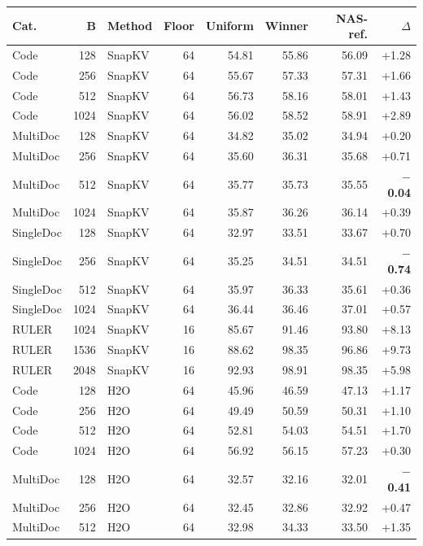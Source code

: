 \begin{table}[!b]
  \centering
  \scriptsize
  \setlength{\tabcolsep}{2.5pt}
  \begin{tabular}{@{}l r l r r r r r@{}}
    \toprule
    Cat. & B & Method & Floor & Uniform & Winner & NAS-ref. & $\Delta$ \\
    \midrule
    Code & 128 & SnapKV & 64 & 54.81 & 55.86 & 56.09 & +1.28 \\
    Code & 256 & SnapKV & 64 & 55.67 & 57.33 & 57.31 & +1.66 \\
    Code & 512 & SnapKV & 64 & 56.73 & 58.16 & 58.01 & +1.43 \\
    Code & 1024 & SnapKV & 64 & 56.02 & 58.52 & 58.91 & +2.89 \\
    MultiDoc & 128 & SnapKV & 64 & 34.82 & 35.02 & 34.94 & +0.20 \\
    MultiDoc & 256 & SnapKV & 64 & 35.60 & 36.31 & 35.68 & +0.71 \\
    MultiDoc & 512 & SnapKV & 64 & 35.77 & 35.73 & 35.55 & \textbf{$-$0.04} \\
    MultiDoc & 1024 & SnapKV & 64 & 35.87 & 36.26 & 36.14 & +0.39 \\
    SingleDoc & 128 & SnapKV & 64 & 32.97 & 33.51 & 33.67 & +0.70 \\
    SingleDoc & 256 & SnapKV & 64 & 35.25 & 34.51 & 34.51 & \textbf{$-$0.74} \\
    SingleDoc & 512 & SnapKV & 64 & 35.97 & 36.33 & 35.61 & +0.36 \\
    SingleDoc & 1024 & SnapKV & 64 & 36.44 & 36.46 & 37.01 & +0.57 \\
    RULER & 1024 & SnapKV & 16 & 85.67 & 91.46 & 93.80 & +8.13 \\
    RULER & 1536 & SnapKV & 16 & 88.62 & 98.35 & 96.86 & +9.73 \\
    RULER & 2048 & SnapKV & 16 & 92.93 & 98.91 & 98.35 & +5.98 \\
    Code & 128 & H2O & 64 & 45.96 & 46.59 & 47.13 & +1.17 \\
    Code & 256 & H2O & 64 & 49.49 & 50.59 & 50.31 & +1.10 \\
    Code & 512 & H2O & 64 & 52.81 & 54.03 & 54.51 & +1.70 \\
    Code & 1024 & H2O & 64 & 56.92 & 56.15 & 57.23 & +0.30 \\
    MultiDoc & 128 & H2O & 64 & 32.57 & 32.16 & 32.01 & \textbf{$-$0.41} \\
    MultiDoc & 256 & H2O & 64 & 32.45 & 32.86 & 32.92 & +0.47 \\
    MultiDoc & 512 & H2O & 64 & 32.98 & 34.33 & 33.50 & +1.35 \\

\end{tabular}
\end{table}

